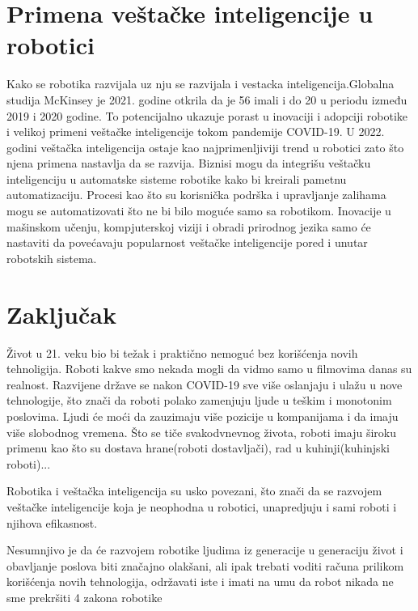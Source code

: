 \documentclass{article}
\begin{document}
\section{Primena veštačke inteligencije u robotici}
Kako se robotika razvijala uz nju se razvijala i vestacka inteligencija.Globalna studija McKinsey je 2021. godine
otkrila da je 56%
imali i do 20%
u periodu između 2019 i 2020 godine. To potencijalno ukazuje porast u inovaciji i adopciji robotike i velikoj primeni veštačke inteligencije tokom pandemije COVID-19. U 2022. godini veštačka inteligencija ostaje kao najprimenljiviji trend u robotici zato što njena primena nastavlja da se razvija. Biznisi mogu da integrišu veštačku inteligenciju u automatske sisteme robotike kako bi
kreirali pametnu automatizaciju. Procesi kao što su korisnička podrška i upravljanje zalihama mogu se  automatizovati što ne bi bilo moguće samo sa robotikom. Inovacije u mašinskom učenju, kompjuterskoj viziji i obradi prirodnog jezika samo će nastaviti da povećavaju popularnost veštačke inteligencije pored i unutar robotskih sistema.
	
	\section{Zaključak}
 Život u 21. veku bio bi težak i praktično nemoguć bez korišćenja novih tehnoligija. Roboti kakve smo nekada mogli da vidmo samo u filmovima danas su realnost. Razvijene države se nakon COVID-19 sve više oslanjaju i ulažu u nove tehnologije, što znači da roboti polako zamenjuju ljude u teškim i monotonim poslovima. Ljudi će moći da zauzimaju više pozicije u kompanijama i da imaju više slobodnog vremena. Što se tiče svakodvnevnog života, roboti imaju široku primenu kao što su dostava hrane(roboti dostavljači), rad u kuhinji(kuhinjski roboti)...

 Robotika i veštačka inteligencija su usko povezani, što znači da se razvojem veštačke inteligencije koja je neophodna u robotici, unapredjuju i sami roboti i njihova efikasnost. 

 Nesumnjivo je da će razvojem robotike ljudima iz generacije u generaciju život i obavljanje poslova biti značajno olakšani, ali ipak trebati voditi računa prilikom korišćenja novih tehnologija, održavati iste i imati na umu da robot nikada ne sme prekršiti 4 zakona robotike
	
\end{document}
